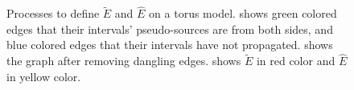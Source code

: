 \documentclass[a4paper,twoside]{article}
\begin{document}
\begin{figure}[bht!]
	\centering		
	\hspace{10pt}
	\hspace{10pt}
	
	\caption[]{Processes to define $\tilde{E}$ and $\hat{E}$ on a torus model.  shows green colored edges that their intervals' pseudo-sources are from both sides, and blue colored edges that their intervals have not propagated.  shows the graph after removing dangling edges.  shows $\tilde{E}$ in red color and $\hat{E}$ in  yellow color.}
	\label{fig:fig-torus_edges_detected}
\end{figure}
\end{document}
